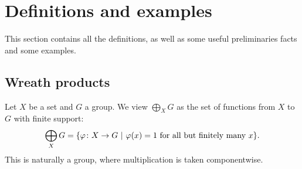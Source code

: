 \documentclass[a4paper]{article}
\newtheorem{cor}[lem]{Corollary}
\theoremstyle{definition}
\newcommand{\setst}[2]{\{#1\ |\ #2\}}
\begin{document}
%
%
%
%
%
%
%
%
%
%
\section{Definitions and examples}\label{Section:Def}
This section contains all the definitions, as well as some useful preliminaries facts and some examples.
%
%
%
%
%
%
%
%
%
%
\subsection{Wreath products}
%
%
%
%
%
Let $X$ be a set and $G$ a group. We view
$\bigoplus_XG$ as the set of functions from $X$ to $G$ with finite support:
\[
	\bigoplus_XG=\setst{\varphi\colon X\to G}{\varphi(x)=1 \textnormal{ for all but finitely many }x}.
\]
This is naturally a group, where multiplication is taken componentwise.
\end{document}
